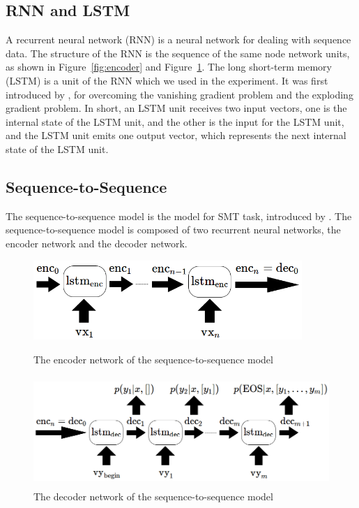 \documentclass[11pt]{jarticle}
\begin{document}
\subsection{RNN and LSTM}
A recurrent neural network (RNN) is a neural network for dealing with sequence data.
The structure of the RNN is the sequence of the same node network units, as shown in Figure~\ref{fig:encoder} and Figure~\ref{fig:decoder}. 
The long short-term memory (LSTM) is a unit of the RNN which we used in the experiment. 
It was first introduced by \sloppy \citet{first_LSTM} , for overcoming the vanishing gradient problem and the exploding gradient problem.
In short, an LSTM unit receives two input vectors, 
one is the internal state of the LSTM unit, and the other is the input for the LSTM unit, 
and the LSTM unit emits one output vector, which represents the next internal state of the LSTM unit.

\subsection{Sequence-to-Sequence}


The sequence-to-sequence model is the model for SMT task, introduced by \citet{seq2seq}.
The sequence-to-sequence model is composed of two recurrent neural networks, the encoder network and the decoder network.

\begin{figure}[]
	\begin{center}
	\includegraphics[height=3cm]{encoder.png}
	\end{center}
	\caption{The encoder network of the sequence-to-sequence model}
	\label{fig:encoder}
	\begin{center}
	\includegraphics[height=4.2cm]{decoder.png}
	\end{center}
	\caption{ The decoder network of the sequence-to-sequence model}
	\label{fig:decoder}
\end{figure}
\end{document}
